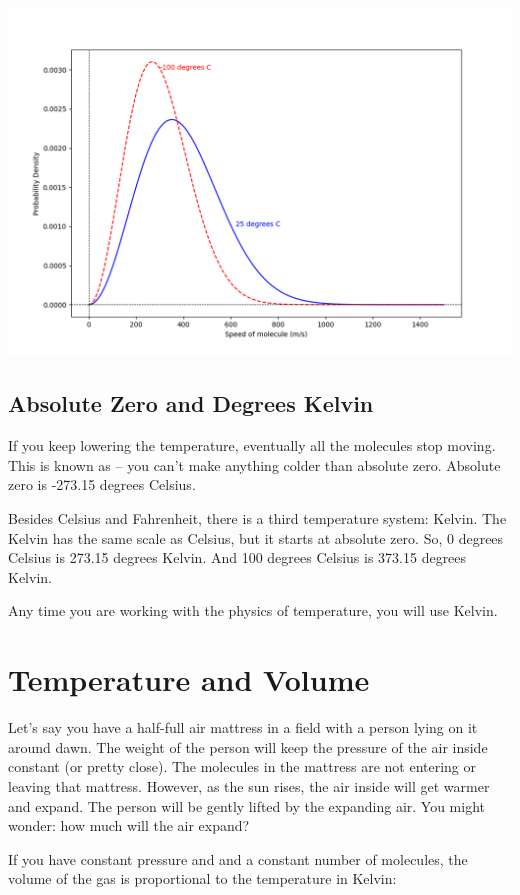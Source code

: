 \includegraphics[width=\textwidth]{ar2_plot.png}

\subsection{Absolute Zero and Degrees Kelvin}

If you keep lowering the temperature,  eventually all the molecules stop moving.  This is known as  -- you
 can't make anything colder than absolute zero.   Absolute zero is -273.15 degrees Celsius.
 
Besides Celsius and Fahrenheit, there is a third temperature system: Kelvin.  The Kelvin has the same scale as Celsius, but it starts at absolute zero.   
So,  0 degrees Celsius is 273.15 degrees Kelvin.    And 100 degrees Celsius is 373.15 degrees Kelvin.

Any time you are working with the physics of temperature, you will use Kelvin.

\section{Temperature and Volume}

Let's say you have a half-full air mattress in a field with a person lying on it around dawn.   The weight of the person will keep the pressure of the air inside constant (or pretty close).  
The molecules in the mattress are not entering or leaving that mattress.  However, as the sun rises,  the air inside will get warmer and expand.  The person will be gently lifted by the expanding air.  You might wonder: how much will the air expand?

If you have constant pressure and and a constant number of molecules,  the volume of the gas is proportional to the temperature in Kelvin:

